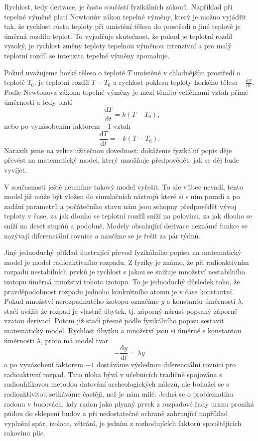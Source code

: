 \documentclass[12pt]{article}
\begin{document}
Rychlost, tedy derivace, je často součástí fyzikálních zákonů. Například při tepelné výměně platí Newtonův zákon tepelné výměny, který je možno vyjádřit tak, že rychlost růstu teploty při umístění tělesa do prostředí o jiné teplotě je úměrná rozdílu teplot. To vyjadřuje skutečnost, že pokud je teplotní rozdíl vysoký, je rychlost změny teploty tepelnou výměnou intenzivní a pro malý teplotní rozdíl se intenzita tepelné výměny zpomaluje. 

Pokud uvažujeme horké těleso o teplotě $T$ umístěné v chladnějším prostředí o teplotě $T_0$, je teplotní rozdíl $T-T_0$ a rychlost poklesu teploty horkého tělesa $-\frac{\mathrm dT}{\mathrm dt}.$ Podle Newtonova zákona tepelné výměny je mezi těmito veličinami vztah přímé úměrnosti a tedy platí $$-\frac {\mathrm dT}{\mathrm dt}=k(T-{T_0}),$$
nebo po vynásobením faktorem $-1$ vztah
$$\frac {\mathrm dT}{\mathrm dt}=-k(T-T_0).$$ Narazili jsme na velice užitečnou dovednost: dokážeme fyzikální popis děje převést na matematický model, který umožňuje předpovědět, jak se děj bude vyvíjet.

V současnosti ještě neumíme takový model vyřešit. To ale vůbec nevadí, tento model již může být vložen do simulačních nástrojů které si s ním poradí a po zadání parametrů a počátečního stavu nám jsou schopny předpovědět vývoj teploty v čase, za jak dlouho se teplotní rozdíl sníží na polovinu, za jak dlouho se sníží na deset stupňů a podobně. Modely obsahující derivace neznámé funkce se nazývají diferenciální rovnice a naučíme se je řešit za pár týdnů.

Jiný jednoduchý příklad ilustrující převod fyzikálního popisu na matematický model je model radioaktivního rozpadu. Z fyziky je známo, že při radioaktivním rozpadu nestabilních prvků je rychlost s jakou se snižuje množství nestabilního izotopu úměrná množství tohoto izotopu. To je jednoduchý důsledek toho, že pravděpodobnost rozpadu jednoho konkrétního atomu je v čase konstantní. Pokud množství nerozpadnutého izotopu označíme $y$ a konstantu úměrnosti $\lambda$, stačí uvážit že rozpad je vlastně úbytek, tj. záporný nárůst popsaný záporně vzatou derivací. Potom již stačí přesně podle fyzikálního popisu sestavit matematický model. Rychlost úbytku a množství jsou si úměrné s konstantou úměrnosti $\lambda$, proto má model tvar $$-\frac{\mathrm dy}{\mathrm dt}=\lambda y$$ a po vynásobení faktorem $-1$ dostáváme výslednou diferenciální rovnici pro radioaktivní rozpad. Tato úloha bývá v učebnicích tradičně spojována s radiouhlíkovou metodou datování archeologických nálezů, ale bohužel se s radioaktivitou setkáváme častěji, než je nám milé. Jedná se o problematiku radonu v budovách, kdy radon jako plynný prvek z rozpadové řady uranu proniká půdou do sklepení budov a při nedostatečné ochraně zahrnující například vyplnění spár, izolace, větrání, je jedním z rozhodujících faktorů spouštějících rakovinu plic.
\end{document}
